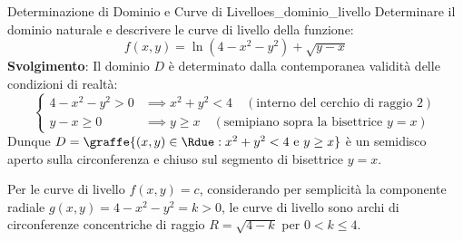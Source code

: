 \begin{center}
\end{center}

\begin{esempio}{Determinazione di Dominio e Curve di Livello}{es_dominio_livello}
Determinare il dominio naturale e descrivere le curve di livello della funzione:
\[
f(x,y) = \ln\left( 4 - x^2 - y^2 \right) + \sqrt{y - x}
\]
\textbf{Svolgimento}:
Il dominio $D$ è determinato dalla contemporanea validità delle condizioni di realtà:
\[
\begin{cases}
4 - x^2 - y^2 > 0 &\implies x^2 + y^2 < 4 \quad (\text{interno del cerchio di raggio } 2) \\
y - x \ge 0 &\implies y \ge x \quad (\text{semipiano sopra la bisettrice } y=x)
\end{cases}
\]
Dunque $D = \graffe{(x,y) \in \Rdue : x^2 + y^2 < 4 \text{ e } y \ge x}$ è un semidisco aperto sulla circonferenza e chiuso sul segmento di bisettrice $y = x$.

Per le curve di livello $f(x,y) = c$, considerando per semplicità la componente radiale $g(x,y) = 4 - x^2 - y^2 = k > 0$, le curve di livello sono archi di circonferenze concentriche di raggio $R = \sqrt{4-k}$ per $0 < k \le 4$.
\end{esempio}

